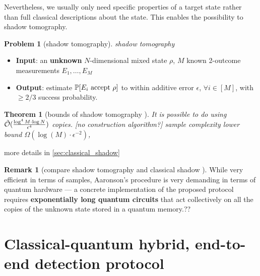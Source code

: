 \documentclass[
aps,
pra,
floatfix,
]{revtex4-2}
\theoremstyle{plain}
\newtheorem{theorem}{Theorem}
\theoremstyle{definition}
\newtheorem{remark}{Remark}
\newtheorem{problem}{Problem}
\newcommand{\dm}{\rho}
\begin{document}
Nevertheless, we usually only need specific properties of a target state rather than full classical descriptions about the state.
This enables the possibility to shadow tomography.
\begin{problem}[shadow tomography]\label{prm:shadow_tomography}
	\emph{shadow tomography}
	\begin{itemize}
		\item \textbf{Input}: an \textbf{unknown} $N$-dimensional mixed state $\rho$, $M$ known 2-outcome measurements $E_1,\dots,E_M$
		\item \textbf{Output}: estimate $\probability[E_i \text{ accept } \dm]$ to within additive error $\epsilon$, $\forall i\in [M]$, with $\ge 2/3$ success probability.	
	\end{itemize}
\end{problem}
\begin{theorem}[bounds of shadow tomography \cite{aaronsonShadowTomographyQuantum2018}]\label{thm:shadow_tomography}
	It is possible to do  using $\tilde{\mathcal{O}}(\frac{\log^4 M\cdot \log N}{\epsilon^4})$ copies. [no construction algorithm?]
	sample complexity lower bound $\Omega(\log (M) \cdot \epsilon^{-2})$, 
\end{theorem}
more details in \cref{sec:classical_shadow}
\begin{remark}[compare shadow tomography and classical shadow \cite{huangPredictingManyProperties2020}]
	While very efficient in terms of samples, Aaronson's procedure is very demanding in terms of quantum hardware — a concrete implementation of the proposed protocol requires \textbf{exponentially long quantum circuits} that act collectively on all the copies of the unknown state stored in a quantum memory.??
\end{remark}

\section{Classical-quantum hybrid, end-to-end detection protocol}
\end{document}
